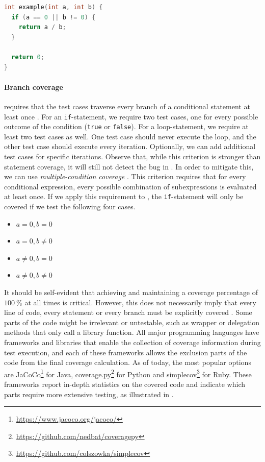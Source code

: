 \begin{lstlisting}[caption=Irrelevant statement coverage in C.,label=lst:statement-coverage-fail,language=C]
int example(int a, int b) {
  if (a == 0 || b != 0) {
    return a / b;
  }
  
  return 0;
}
\end{lstlisting}

\paragraph*{Branch coverage} requires that the test cases traverse every branch of a conditional statement at least once  \cite[p.~37]{Myers:2011:AST:2161638}. For an \texttt{if}-statement, we require two test cases, one for every possible outcome of the condition (\texttt{true} or \texttt{false}). For a loop-statement, we require at least two test cases as well. One test case should never execute the loop, and the other test case should execute every iteration. Optionally, we can add additional test cases for specific iterations. Observe that, while this criterion is stronger than statement coverage, it will still not detect the bug in . In order to mitigate this, we can use \emph{multiple-condition coverage} \cite[p.~40]{Myers:2011:AST:2161638}. This criterion requires that for every conditional expression, every possible combination of subexpressions is evaluated at least once. If we apply this requirement to , the \texttt{if}-statement will only be covered if we test the following four cases.

\begin{itemize}
	\item $a = 0, b = 0$
	\item $a = 0, b \neq 0$
	\item $a \neq 0, b = 0$
	\item $a \neq 0, b \neq 0$
\end{itemize}

\noindent It should be self-evident that achieving and maintaining a coverage percentage of $\SI{100}{\percent}$ at all times is critical. However, this does not necessarily imply that every line of code, every statement or every branch must be explicitly covered \cite{dein_2019}. Some parts of the code might be irrelevant or untestable, such as wrapper or delegation methods that only call a library function. All major programming languages have frameworks and libraries that enable the collection of coverage information during test execution, and each of these frameworks allows the exclusion parts of the code from the final coverage calculation. As of today, the most popular options are JaCoCo\footnote{\url{https://www.jacoco.org/jacoco/}} for Java, coverage.py\footnote{\url{https://github.com/nedbat/coveragepy}} for Python and simplecov\footnote{\url{https://github.com/colszowka/simplecov}} for Ruby. These frameworks report in-depth statistics on the covered code and indicate which parts require more extensive testing, as illustrated in .


